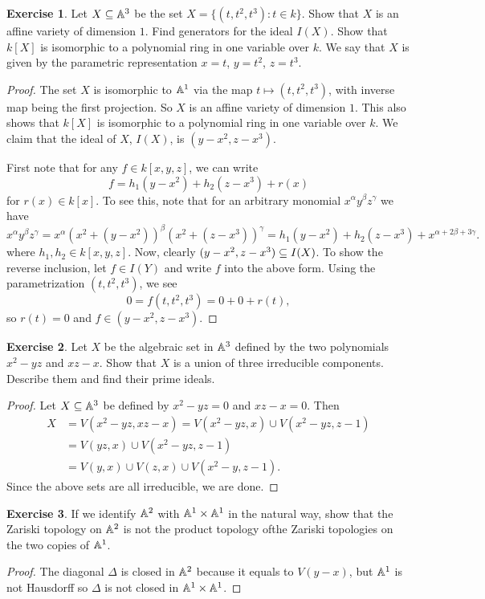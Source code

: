 \documentclass[11pt]{book}
\theoremstyle{definition}
\newtheorem{exercise}{Exercise}[section]
\begin{document}
\begin{exercise}
Let $X\subseteq\mathbb{A}^3$ be the set $X=\{(t,t^2,t^3):t\in k\}$. Show that $X$ is an affine variety of dimension $1$. Find generators for the ideal $I(X)$. Show that $k[X]$ is isomorphic to a polynomial ring in one variable over $k$. We say that $X$ is given by the parametric representation $x=t$, $y=t^2$, $z=t^3$.
\end{exercise}
\begin{proof}
The set $X$ is isomorphic to $\mathbb{A}^1$ via the map $t\mapsto(t,t^2,t^3)$, with inverse map being the first projection. So $X$ is an affine variety of dimension $1$. This also shows that $k[X]$ is isomorphic to a polynomial ring in one variable over $k$. We claim that the ideal of $X$, $I(X)$, is $(y-x^2,z-x^3)$.\par
First note that for any $f\in k[x,y,z]$, we can write 
\[f=h_1(y-x^2)+h_2(z-x^3)+r(x)\]
for $r(x)\in k[x]$. To see this, note that for an arbitrary monomial $x^\alpha y^\beta z^\gamma$ we have
\[x^\alpha y^\beta z^\gamma=x^\alpha(x^2+(y-x^2))^\beta(x^2+(z-x^3))^\gamma=h_1(y-x^2)+h_2(z-x^3)+x^{\alpha+2\beta+3\gamma}.\]
where $h_1,h_2\in k[x,y,z]$. Now, clearly $(y-x^2,z-x^3)\subseteq I(X)$. To show the reverse inclusion, let $f\in I(Y)$ and write $f$ into the above form. Using the parametrization $(t,t^2,t^3)$, we see
\[0=f(t,t^2,t^3)=0+0+r(t),\]
so $r(t)=0$ and $f\in(y-x^2,z-x^3)$.
\end{proof}
\begin{exercise}
Let $X$ be the algebraic set in $\mathbb{A}^3$ defined by the two polynomials $x^2-yz$ and $xz-x$. Show that $X$ is a union of three irreducible components. Describe them and find their prime ideals.
\end{exercise}
\begin{proof}
Let $X\subseteq\mathbb{A}^3$ be defined by $x^2-yz=0$ and $xz-x=0$. Then
\begin{align*}
X&=V(x^2-yz,xz-x)=V(x^2-yz,x)\cup V(x^2-yz,z-1)\\
&=V(yz,x)\cup V(x^2-yz,z-1)\\
&=V(y,x)\cup V(z,x)\cup V(x^2-y,z-1).
\end{align*}
Since the above sets are all irreducible, we are done.
\end{proof}
\begin{exercise}
If we identify $\mathbb{A}^2$ with $\mathbb{A}^1\times\mathbb{A}^1$ in the natural way, show that the Zariski topology on $\mathbb{A}^2$ is not the product topology ofthe Zariski topologies on the two copies of $\mathbb{A}^1$.
\end{exercise}
\begin{proof}
The diagonal $\Delta$ is closed in $\mathbb{A}^2$ because it equals to $V(y-x)$, but $\mathbb{A}^1$ is not Hausdorff so $\Delta$ is not closed in $\mathbb{A}^1\times\mathbb{A}^1$.
\end{proof}
\end{document}
